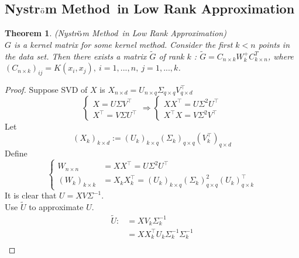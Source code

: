 \documentclass[12pt, a4paper, oneside]{article}
\newtheorem{theorem}{Theorem}
\newcommand{\nysm}{Nystr$\ddot{\rm o}$m Method}
\begin{document}
\subsection{\nysm\ in Low Rank Approximation}
\label{subsec:snm}

\begin{theorem} (\nysm \ in Low Rank Approximation) \\
	\label{thm:nmlr}
	$G$ is a kernel matrix for some kernel method. Consider the first $k<n$ points in the data set. Then there exists a matrix $\tilde{G}$ of rank $k$ : $\tilde{G}=C_{n\times k} W_k^+ C^T_{k\times n}$, where $(C_{n\times k})_{ij} = K(x_i, x_j),\ i = 1, ..., n,\ j = 1,..., k$.
\end{theorem}

\begin{proof}
Suppose SVD of $X$ is $X_{n \times d}=U_{n \times q} \Sigma_{q \times q} V_{q \times d}^{\top}$
\begin{equation}
	\left\{\begin{array}{l}X=U \Sigma V^{\top} \\ X^{\top}=V \Sigma U^{\top}\end{array} \Rightarrow\left\{\begin{array}{l}X X^{\top}=U \Sigma^{2} U^{\top} \\ X^{\top} X=V \Sigma^{2} V^{\top}\end{array}\right.\right.
\end{equation}
Let 
\begin{equation}
	\left(X_{k}\right)_{k \times d}:=\left(U_{k}\right)_{k \times q}\left(\Sigma_{k}\right)_{q \times q}\left(V_{k}^{\top}\right)_{q \times d}
\end{equation}
Define
\begin{equation}
	\left\{\begin{array}{ll}
		W_{n \times n} &=X X^{\top}=U \Sigma^{2} U^{\top}
		\\
		\left(W_{k}\right)_{k \times k}&=X_{k} X_{k}^{\top}=\left(U_{k}\right)_{k \times q}\left(\Sigma_{k}\right)_{q \times q}^{2}\left(U_{k}\right)^{\top}_{ q \times k}
	\end{array}\right.
\end{equation}
It is clear that $U=X V \Sigma^{-1}$. \\
Use $\tilde{U}$ to approximate $U$.
\begin{equation}
	\label{eq:u}
	\begin{aligned}
		\tilde{U}: &=X V_{k} \Sigma_{k}^{-1} \\
		&=X X_{k}^{\top} U_{k} \Sigma_{k}^{-1} \Sigma_{k}^{-1} \\

\end{aligned}
\end{equation}
\end{proof}
\end{document}
